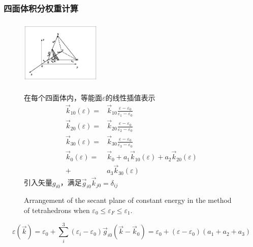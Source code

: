 \documentclass[cjk,slidestop,compress,mathserif,blue]{beamer}
\begin{document}
\frame
{
	\frametitle{四面体积分权重计算}
\begin{figure}[h!]
\begin{minipage}[t]{0.45\linewidth}
\centering
\includegraphics[height=1.25in,width=1.50in,viewport=15 15 250 190,clip]{Figures/Tetrahedron.eps}
\caption{\small Arrangement of the secant plane of constant energy in the method of tetrahedrons when $\varepsilon_0\leqslant\varepsilon_F\leqslant\varepsilon_1$.}%
\label{Fig:Tetrahedron}
\end{minipage}
\hfill
\begin{minipage}[t]{0.50\linewidth}
	\vspace*{-100pt}
	在每个四面体内，等能面$\varepsilon$的线性插值表示
		\begin{displaymath}
			\begin{aligned}
				\vec k_{10}(\varepsilon)=&\vec k_{10}\frac{\varepsilon-\varepsilon_0}{\varepsilon_1-\varepsilon_0}\\
				\vec k_{20}(\varepsilon)=&\vec k_{20}\frac{\varepsilon-\varepsilon_0}{\varepsilon_2-\varepsilon_0}\\
				\vec k_{30}(\varepsilon)=&\vec k_{30}\frac{\varepsilon-\varepsilon_0}{\varepsilon_3-\varepsilon_0}\\
			\vec k_0(\varepsilon)=&\vec k_0+a_1\vec k_{10}(\varepsilon)+a_2\vec k_{20}(\varepsilon)\\
			+&a_3\vec k_{30}(\varepsilon)
			\end{aligned}
		\end{displaymath}
		\hspace*{-15pt}引入矢量$g_{i0}$，满足$\vec g_{i0}\vec k_{j0}=\delta_{ij}$
\end{minipage}
\end{figure}
		$$\varepsilon(\vec k)=\varepsilon_0+\sum_i^3(\varepsilon_i-\varepsilon_0)\vec g_{i0}(\vec k-\vec k_0)=\varepsilon_0+(\varepsilon-\varepsilon_0)(a_1+a_2+a_3)$$
}
\end{document}
